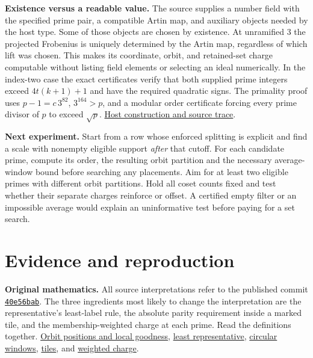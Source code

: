 \documentclass[11pt,letterpaper]{article}
\newcommand{\orig}[3]{\href{https://github.com/nousentllc/riemann-hypothesis/blob/40e56bab026552e089d7afcfeff08d2defb9c005/src/#1.lean\#L#2}{#3}}
\newcommand{\loc}[2]{\href{run:evidence/#1}{#2}}
\newcommand{\pp}[1]{\par\medskip\noindent\textbf{#1}\enspace}
\begin{document}
\pp{Existence versus a readable value.} The source supplies a number field with the specified prime pair, a compatible Artin map, and auxiliary objects needed by the host type. Some of those objects are chosen by existence. At unramified 3 the projected Frobenius is uniquely determined by the Artin map, regardless of which lift was chosen. This makes its coordinate, orbit, and retained-set charge computable without listing field elements or selecting an ideal numerically. In the index-two case the exact certificates verify that both supplied prime integers exceed \(4t(k+1)+1\) and have the required quadratic signs. The primality proof uses \(p-1=c\,3^{82}\), \(3^{164}>p\), and a modular order certificate forcing every prime divisor of \(p\) to exceed \(\sqrt p\). \loc{HOST.md}{Host construction and source trace}.

\pp{Next experiment.} Start from a row whose enforced splitting is explicit and find a scale with nonempty eligible support \emph{after} that cutoff. For each candidate prime, compute its order, the resulting orbit partition and the necessary average-window bound before searching any placements. Aim for at least two eligible primes with different orbit partitions. Hold all coset counts fixed and test whether their separate charges reinforce or offset. A certified empty filter or an impossible average would explain an uninformative test before paying for a set search.

\clearpage\section*{Evidence and reproduction}
\pp{Original mathematics.} All source interpretations refer to the published commit \href{https://github.com/nousentllc/riemann-hypothesis/tree/40e56bab026552e089d7afcfeff08d2defb9c005}{\texttt{40e56bab}}. The three ingredients most likely to change the interpretation are the representative's least-label rule, the absolute parity requirement inside a marked tile, and the membership-weighted charge at each prime. Read the definitions together. \orig{Formalism/LocalToGlobal/GlobalTheory/IsResidueClassZero}{86}{Orbit positions and local goodness}, \orig{Formalism/LocalToGlobal/GlobalTheory/IsResidueClassZero}{267}{least representative}, \orig{Formalism/SubspaceCounting/StatementB}{9}{circular windows}, \orig{Formalism/SubspaceCounting/GoodOrbitIntervalTileCondition}{10}{tiles}, and \orig{Development/AbelianVarietyTheory/Definitions/GlobalTwisting/ThinScalesIffHostBound}{36}{weighted charge}.
\end{document}

